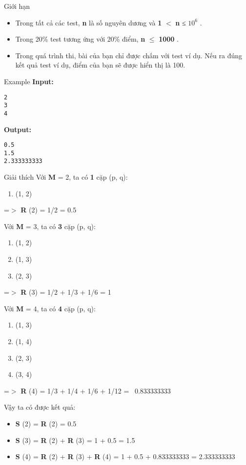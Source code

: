 Giới hạn  
\begin{itemize}
	\item     Trong tất cả các test,    \textbf{     n    }    là số nguyên dương và    \textbf{     1    }    $<$    \textbf{     n    }    ≤    \textbf{     $10^{6}$}    .   
	\item     Trong 20\% test tương ứng với 20\% điểm,    \textbf{     n    }     $\le$     \textbf{     1000    }    .   
	\item     Trong quá trình thi, bài của bạn chỉ được chấm với test ví dụ. Nếu ra đúng kết quả test ví dụ, điểm của bạn sẽ được hiển thị là 100.   
\end{itemize}
   Example  
\textbf{    Input:   }
\begin{verbatim}
2
3
4
\end{verbatim}

\textbf{    Output:   }
\begin{verbatim}
0.5
1.5
2.333333333\end{verbatim}
   Giải thích  
Với   \textbf{    M   }   = 2, ta có   \textbf{    1   }   cặp (p, q):  
\begin{enumerate}
	\item     (1, 2)   
\end{enumerate}

   =$>$   \textbf{    R   }   (2) = 1/2 = 0.5  

   Với   \textbf{    M   }   = 3, ta có   \textbf{    3   }   cặp (p, q):  
\begin{enumerate}
	\item     (1, 2)   
	\item     (1, 3)   
	\item     (2, 3)   
\end{enumerate}

   =$>$   \textbf{    R   }   (3) = 1/2 + 1/3 + 1/6 = 1  

   Với   \textbf{    M   }   = 4, ta có   \textbf{    4   }   cặp (p, q):  
\begin{enumerate}
	\item     (1, 3)   
	\item     (1, 4)   
	\item     (2, 3)   
	\item     (3, 4)   
\end{enumerate}

   =$>$   \textbf{    R   }   (4) = 1/3 + 1/4 + 1/6 + 1/12 =  0.833333333  

   Vậy ta có được kết quả:  
\begin{itemize}
	\item \textbf{     S    }    (2) =    \textbf{     R    }    (2) = 0.5   
	\item \textbf{     S    }    (3) =    \textbf{     R    }    (2) +    \textbf{     R    }    (3) = 1 + 0.5 = 1.5   
	\item \textbf{     S    }    (4) =    \textbf{     R    }    (2) +    \textbf{     R    }    (3) +    \textbf{     R    }    (4) = 1 + 0.5 + 0.833333333 = 2.333333333   
\end{itemize}